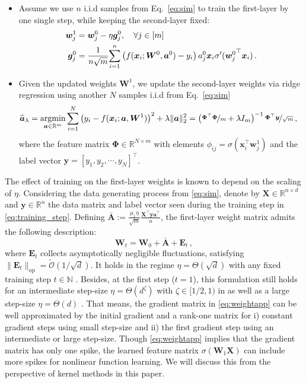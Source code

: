 \begin{itemize}[leftmargin=*,topsep=0.5mm, itemsep=0.mm]
    \item Assume we use $n$ i.i.d samples from Eq.~\eqref{eq:sim} to train the first-layer by one single step, while keeping the second-layer fixed:
    \begin{align}
        \label{eq:training_step}
         \bm w_{j}^1 & = \bm w_{j}^0 - \eta \bm g_j^0, \quad \forall j \in [m] \\
         \bm g_j^0 & = \frac{1}{n \sqrt m} \!\sum_{i=1}^n  \left(f(\bm x_i; \bm W^{0},\bm a^{0}) - y_i \right) a_j^0 \bm x_i \sigma^\prime ({\bm w_j^0}^{\top} \bm x_i)\,. \notag
    \end{align}
    \item Given the updated weights $\bm W^{1}$, we update the second-layer weights via ridge regression using another $N$ samples i.i.d from Eq.~\eqref{eq:sim} 
    \begin{align}
        \label{eq:def:main:erm}
        \widehat{\bm a}_{\lambda}&=\underset{\bm a\in\mathbb{R}^{m}}{\rm argmin} \sum_{i = 1}^N \left(y_i -f(\bm x_i ;\bm a,\bm W^{1})\right)^{2}+\lambda \| \bm a \|_{2}^{2} =\left(\nicefrac{\bm \Phi^{\top} \bm \Phi}{m}+\lambda I_{m}\right)^{-1}\nicefrac{\bm \Phi^{\top} \bm y}{\sqrt{m}}\,,
    \end{align}
    where the feature matrix $\bm \Phi \in\mathbb{R}^{N\times m}$ with elements $\phi_{i j}=\sigma(\bm x_i^{\top}{\bm w^{1}_{j}})$ and the label vector $\bm y = [y_1, y_2, \cdots, y_N]^{\!\top}$.
\end{itemize}
The effect of training on the first-layer weights is known to depend on the scaling of $\eta$. Considering the data generating process from \cref{eq:sim}, denote by $\bm X \in \mathbb R^{n \times d}$ and $\bm y \in \mathbb R^{n}$ the data matrix and label vector seen during the training step in \cref{eq:training_step}. Defining $\bar{\bm A} := \frac{\mu_1\eta}{\sqrt{m}}\frac{\bm X^\top \bm y \bm a^\top}{n}$, the first-layer weight matrix admits the following description:
\begin{equation}\label{eq:weightapp}%
    \bm W_t = \bm W_0 + \bar{\bm A} + \bm E_t\,,    
\end{equation}
where $\bm E_t$ collects asymptotically negligible fluctuations, satisfying $\|\bm E_t\|_{\text{op}}=\tilde{\mathcal O}(1 / \sqrt{d})$.
It holds in the regime $\eta=\Theta(\sqrt{d})$ with any fixed training step $t\in\mathbb{N}$ \citep{ba2022high,wang2024nonlinear}.
Besides, at the first step ($t=1$), this formulation still holds for an intermediate step-size $\eta = \Theta(d^{\zeta})$ with $\zeta \in [1/2, 1)$ in \citep{moniri2023theory} as well as a large step-size $\eta = \Theta(d)$ \citep{cui2024asymptotics,dandi2024random}.
That means, the gradient matrix in \cref{eq:weightapp} can be well approximated by the initial gradient and a rank-one matrix for i) constant gradient steps using small step-size and ii) the first gradient step using an intermediate or large step-size.
Though \cref{eq:weightapp} implies that the gradient matrix has only one spike, the learned feature matrix $\sigma(\bm W_1 \bm X)$ can include more spikes for nonlinear function learning. We will discuss this from the perspective of kernel methods in this paper. 

